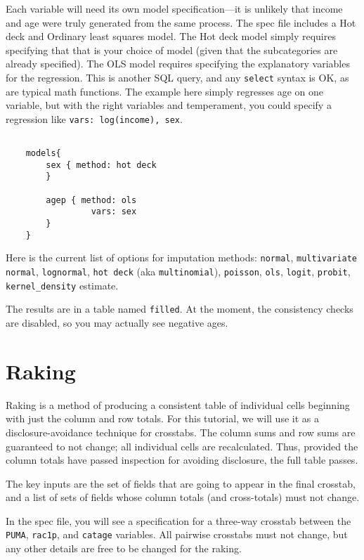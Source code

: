 \documentclass{article}
\begin{document}
Each variable will need its own model specification---it is unlikely that income and age
were truly generated from the same process.  The spec file includes a Hot deck and
Ordinary least squares model. The Hot deck model simply requires specifying that that is
your choice of model (given that the subcategories are already specified). The OLS model
requires specifying the explanatory variables for the regression. This is another SQL
query, and any {\tt select} syntax is OK, as are typical math functions. The example here
simply regresses age on one variable, but with the right
variables and temperament, you could specify a regression like {\tt vars: log(income), sex}.

\begin{specbit}
\begin{verbatim}

    models{
        sex { method: hot deck
        }

        agep { method: ols
                 vars: sex
        }
    }
\end{verbatim}
\end{specbit}

Here is the current list of options for imputation methods: 
{\tt normal}, {\tt multivariate normal}, {\tt lognormal}, {\tt hot deck} (aka {\tt multinomial}),
{\tt poisson}, {\tt ols}, {\tt logit}, {\tt probit}, {\tt kernel\_density} estimate.

The results are in a table named {\tt filled}. At the moment, the consistency checks are
disabled, so you may actually see negative ages.



\section{Raking}
Raking is a method of producing a consistent table of individual cells beginning
with just the column and row totals. For this tutorial, we will use it as a
disclosure-avoidance technique for crosstabs. The column sums
and row sums are guaranteed to not change; all individual cells are
recalculated. Thus, provided the column totals have passed inspection for
avoiding disclosure, the full table passes.

The key inputs are the set of fields that are going to appear in the final
crosstab, and a list of sets of fields whose column totals (and cross-totals)
must not change.

In the spec file, you will see a specification for a three-way crosstab between
the {\tt PUMA}, {\tt rac1p}, and {\tt catage} variables. All pairwise crosstabs 
must not change, but any other details are free to be changed for the raking.
\end{document}
